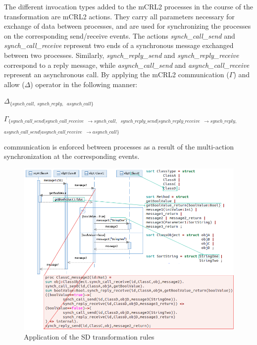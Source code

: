 \documentclass[letter]{llncs}
\newcommand{\figshrink}{\vspace{-.6cm}}
\newcommand{\figshrinkend}{}
\begin{document}
The different invocation types added to the mCRL2 processes in the course of the transformation are mCRL2 actions.
They carry all parameters necessary for exchange of data between processes, and are used for synchronizing the processes
on the corresponding send/receive events. The actions \emph{synch\_call\_send} and \emph{synch\_call\_receive} represent
two ends of a synchronous message exchanged between two processes. Similarly, \emph{synch\_reply\_send} 
and \emph{synch\_reply\_receive} correspond to a reply message, while \emph{asynch\_call\_send} and \emph{asynch\_call\_receive} 
represent an asynchronous call. By applying the mCRL2 communication ($\Gamma$) and allow ($\Delta$) operator in the following manner:
\begin{center}
$ \Delta_{\{synch\_call,\ synch\_reply, } $
  $    _{asynch\_call\}} $
  
$ \Gamma_{\{synch\_call\_send|
   synch\_call\_receive} $
  $  _{\rightarrow synch\_call, } $
  $ _{synch\_reply\_send|synch\_reply\_receive} $
  $  _{\rightarrow synch\_reply,} $
 $ _{asynch\_call\_send|asynch\_call\_receive} $
  $  _{\rightarrow asynch\_call\}} $
\end{center}
communication is enforced between processes as a result of the multi-action synchronization at the corresponding events. 

\begin{figure}[t!]
\centering
\figshrink
\includegraphics[width=1.0\linewidth]{./yea1.png}
\caption{Application of the SD transformation rules}
\label{fig:application1}
\figshrinkend
\end{figure}
\end{document}

